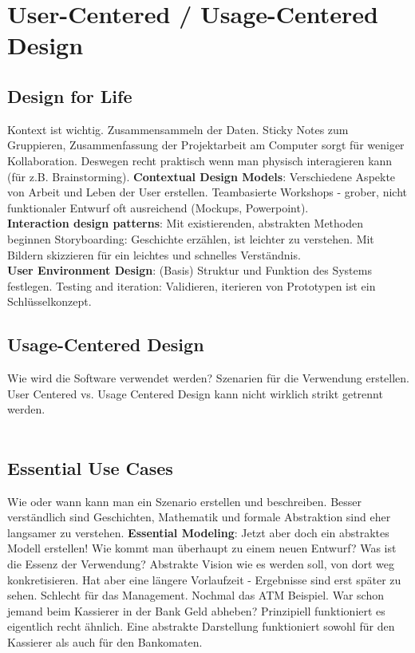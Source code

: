 \section{User-Centered / Usage-Centered Design}
\subsection{Design for Life}

Kontext ist wichtig.
Zusammensammeln der Daten.
Sticky Notes zum Gruppieren, Zusammenfassung der Projektarbeit am Computer sorgt
für weniger Kollaboration. 
Deswegen recht praktisch wenn man physisch interagieren kann (für z.B. Brainstorming).
\textbf{Contextual Design Models}: Verschiedene Aspekte von Arbeit und Leben der User erstellen.
Teambasierte Workshops - grober, nicht funktionaler Entwurf oft ausreichend (Mockups, Powerpoint). \\
\textbf{Interaction design patterns}: Mit existierenden, abstrakten Methoden beginnen
Storyboarding: Geschichte erzählen, ist leichter zu verstehen. Mit Bildern skizzieren
für ein leichtes und schnelles Verständnis. \\
\textbf{User Environment Design}: (Basis) Struktur und Funktion des Systems festlegen.
Testing and iteration: Validieren, iterieren von Prototypen ist ein Schlüsselkonzept.\\

\subsection{Usage-Centered Design}
Wie wird die Software verwendet werden?
Szenarien für die Verwendung erstellen.
User Centered vs. Usage Centered Design kann nicht wirklich strikt getrennt werden. 
\\
\noindent{}
\\
\subsection{Essential Use Cases}
Wie oder wann kann man ein Szenario erstellen und beschreiben. 
Besser verständlich sind Geschichten, Mathematik und formale Abstraktion sind 
eher langsamer zu verstehen. 
\textbf{Essential Modeling}: Jetzt aber doch ein abstraktes Modell erstellen! 
Wie kommt man überhaupt zu einem neuen Entwurf? Was ist die Essenz der Verwendung?
Abstrakte Vision wie es werden soll, von dort weg konkretisieren. Hat aber eine
längere Vorlaufzeit - Ergebnisse sind erst später zu sehen. Schlecht für das
Management.
Nochmal das ATM Beispiel. War schon jemand beim Kassierer in der Bank Geld abheben? 
Prinzipiell funktioniert es eigentlich recht ähnlich. 
Eine abstrakte Darstellung funktioniert sowohl für den Kassierer als auch für den Bankomaten. 

